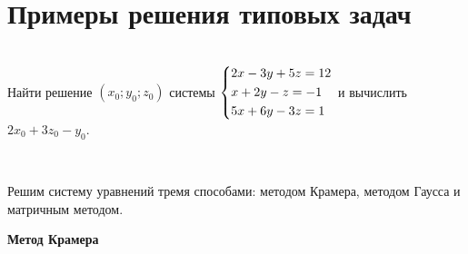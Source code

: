 \documentclass[10pt]{article}
\newcounter{primer}
\numberwithin{primer}{section}
\renewcommand{\theprimer}{\thesection.\arabic{primer}}
\newenvironment{examp}%
{\refstepcounter{primer}
\begin{center}\fboxsep=1.6\fboxrule \shadowsize=4pt \begin{Sbox}
\begin{minipage}[c]{0.63\textwidth}\shadowsize=2pt\shadowbox{\fboxsep=2pt\colorbox[rgb]{0.843,0.98,1}{\large
Пример \theprimer}}
\par\vspace*{6pt}}%
{\end{minipage}\end{Sbox}\shadowbox{\fboxsep=5pt\colorbox[rgb]{0.686,0.898,1}{\TheSbox}}
\end{center}}
\numberwithin{equation}{section}
\begin{document}

\newpage
\section{Примеры решения типовых задач}
\noindent\hrulefill\,\,\hrulefill\vspace{4pt}\\
Найти решение $\left(x_0;y_0;z_0\right)$ системы $\left\{ \begin{gathered}
2x - 3y + 5z = 12 \hfill \\
x + 2y - z = -1 \hfill \\
5x + 6y - 3z =  1 \hfill \\
\end{gathered}  \right.$ и вычислить $2x_0+3z_0-y_0$.\vspace{4pt}

\noindent{}\,\hrulefill\vspace{4pt}

Решим систему уравнений тремя способами: методом Крамера, методом Гаусса и матричным методом.
\begin{center}
	\textbf{Метод Крамера}
\end{center}
\end{document}
